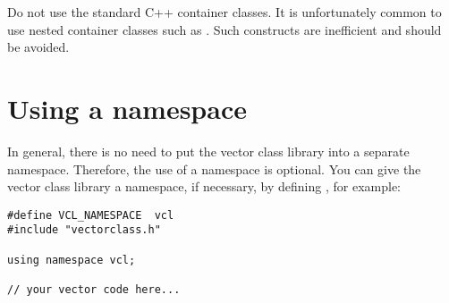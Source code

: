 \documentclass[vcl_manual.tex]{subfiles}
\begin{document}
Do not use the standard C++ container classes. It is unfortunately common to use nested container classes such as . Such constructs are inefficient and should be avoided.



\section{Using a namespace} \label{UsingANamespace}

In general, there is no need to put the vector class library into a separate namespace. Therefore, the use of a namespace is optional. You can give the vector class library a namespace, if necessary, by defining , for example:

\begin{lstlisting}[frame=single]
#define VCL_NAMESPACE  vcl
#include "vectorclass.h"

using namespace vcl;

// your vector code here...
\end{lstlisting}
\end{document}
